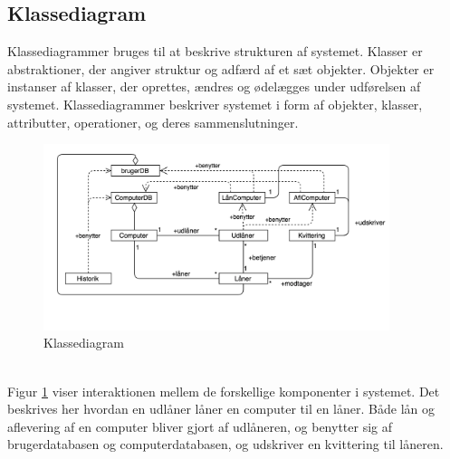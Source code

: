 \documentclass[a4paper]{article}
\begin{document}
\subsection{Klassediagram}
Klassediagrammer bruges til at beskrive strukturen af systemet. Klasser er abstraktioner, der angiver struktur og adfærd af et sæt objekter. Objekter er instanser af klasser, der oprettes, ændres og ødelægges under udførelsen af systemet. Klassediagrammer beskriver systemet i form af objekter, klasser, attributter, operationer, og deres sammenslutninger. \cite[p~30]{OOSE} 
\begin{figure}[h!]
\includegraphics[width=0.9\textwidth]{klassediagram}
  \caption{Klassediagram}
    \label{fig:KLS}
  \centering
\end{figure}\\
Figur \ref{fig:KLS} viser interaktionen mellem de forskellige komponenter i systemet. Det beskrives her hvordan en udlåner låner en computer til en låner. Både lån og aflevering af en computer bliver gjort af udlåneren, og benytter sig af brugerdatabasen og computerdatabasen, og udskriver en kvittering til låneren.
\newpage
\end{document}
